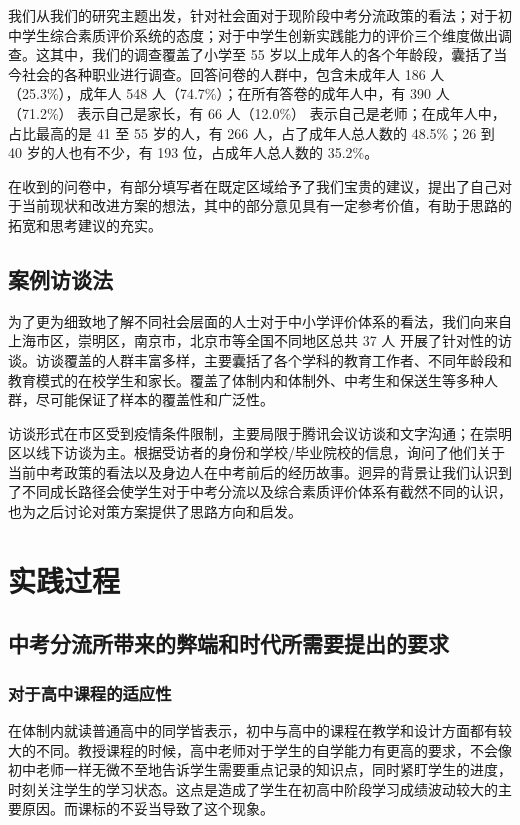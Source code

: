 \documentclass[12pt,UTF8]{ctexart}
\begin{document}
\par{我们从我们的研究主题出发，针对社会面对于现阶段中考分流政策的看法；对于初中学生综合素质评价系统的态度；对于中学生创新实践能力的评价三个维度做出调查。这其中，我们的调查覆盖了小学至
	55 岁以上成年人的各个年龄段，囊括了当今社会的各种职业进行调查。回答问卷的人群中，包含未成年人 186 人（25.3\%），成年人 548
	人（74.7\%）；在所有答卷的成年人中，有 390 人（71.2\%） 表示自己是家长，有 66 人（12.0\%） 表示自己是老师；在成年人中，占比最高的是
	41 至 55 岁的人，有 266 人，占了成年人总人数的 48.5\%；26 到 40 岁的人也有不少，有 193 位，占成年人总人数的 35.2\%。}

\par{
	在收到的问卷中，有部分填写者在既定区域给予了我们宝贵的建议，提出了自己对于当前现状和改进方案的想法，其中的部分意见具有一定参考价值，有助于思路的拓宽和思考建议的充实。}

\subsection{案例访谈法}
\par{为了更为细致地了解不同社会层面的人士对于中小学评价体系的看法，我们向来自上海市区，崇明区，南京市，北京市等全国不同地区总共 37 人
	开展了针对性的访谈。访谈覆盖的人群丰富多样，主要囊括了各个学科的教育工作者、不同年龄段和教育模式的在校学生和家长。覆盖了体制内和体制外、中考生和保送生等多种人群，尽可能保证了样本的覆盖性和广泛性。}

\par{访谈形式在市区受到疫情条件限制，主要局限于腾讯会议访谈和文字沟通；在崇明区以线下访谈为主。根据受访者的身份和学校/毕业院校的信息，询问了他们关于当前中考政策的看法以及身边人在中考前后的经历故事。迥异的背景让我们认识到了不同成长路径会使学生对于中考分流以及综合素质评价体系有截然不同的认识，也为之后讨论对策方案提供了思路方向和启发。}

\newpage

\section {实践过程}
\subsection {中考分流所带来的弊端和时代所需要提出的要求}
\subsubsection {对于高中课程的适应性}
\par{在体制内就读普通高中的同学皆表示，初中与高中的课程在教学和设计方面都有较大的不同。教授课程的时候，高中老师对于学生的自学能力有更高的要求，不会像初中老师一样无微不至地告诉学生需要重点记录的知识点，同时紧盯学生的进度，时刻关注学生的学习状态。这点是造成了学生在初高中阶段学习成绩波动较大的主要原因。而课标的不妥当导致了这个现象。}
\end{document}
